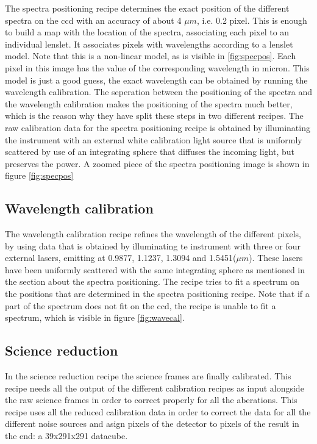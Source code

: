 \documentclass[twoside,single]{lion-msc}
\begin{document}
The spectra positioning recipe determines the exact position of the different spectra on the ccd with an accuracy of about 4 $\mu m$, i.e. 0.2 pixel\citep{Desidera}. This is enough to build a map with the location of the spectra, associating each pixel to an individual lenslet. It associates pixels with wavelengths according to a lenslet model. Note that this is a non-linear model, as is visible in \ref{fig:specpos}. Each pixel in this image has the value of the corresponding wavelength in micron. This model is just a good guess, the exact wavelength can be obtained by running the wavelength calibration. The seperation between the positioning of the spectra and the wavelength calibration makes the positioning of the spectra much better, which is the reason why they have split these steps in two different recipes. The raw calibration data for the spectra positioning recipe is obtained by illuminating the instrument with an external white calibration light source that is uniformly scattered by use of an integrating sphere that diffuses the incoming light, but preserves the power. A zoomed piece of the spectra positioning image is shown in figure \ref{fig:specpos}

\subsection{Wavelength calibration}
The wavelength calibration recipe refines the wavelength of the different pixels, by using data that is obtained by illuminating te instrument with three or four external lasers, emitting at 0.9877, 1.1237, 1.3094 and 1.5451($\mu m$). These lasers have been uniformly scattered with the same integrating sphere as mentioned in the section about the spectra positioning. The recipe tries to fit a spectrum on the positions that are determined in the spectra positioning recipe. Note that if a part of the spectrum does not fit on the ccd, the recipe is unable to fit a spectrum, which is visible in figure \ref{fig:wavecal}.

\subsection{Science reduction}
In the science reduction recipe the science frames are finally calibrated. This recipe needs all the output of the different calibration recipes as input alongside the raw science frames in order to correct properly for all the aberations. This recipe uses all the reduced calibration data in order to correct the data for all the different noise sources and asign pixels of the detector to pixels of the result in the end: a 39x291x291 datacube.
\end{document}
